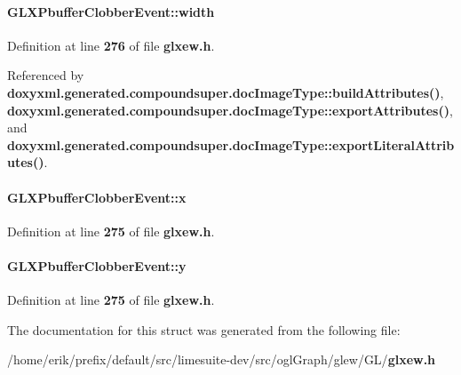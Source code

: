 \paragraph[{width}]{ G\+L\+X\+Pbuffer\+Clobber\+Event\+::width}\label{structGLXPbufferClobberEvent_aaca375fecb872c73c60cd5d0bfc7c7a5}


Definition at line {\bf 276} of file {\bf glxew.\+h}.



Referenced by {\bf doxyxml.\+generated.\+compoundsuper.\+doc\+Image\+Type\+::build\+Attributes()}, {\bf doxyxml.\+generated.\+compoundsuper.\+doc\+Image\+Type\+::export\+Attributes()}, and {\bf doxyxml.\+generated.\+compoundsuper.\+doc\+Image\+Type\+::export\+Literal\+Attributes()}.

\paragraph[{x}]{ G\+L\+X\+Pbuffer\+Clobber\+Event\+::x}\label{structGLXPbufferClobberEvent_a8f0a7162a033c89ee94ce535580dbc32}


Definition at line {\bf 275} of file {\bf glxew.\+h}.

\paragraph[{y}]{ G\+L\+X\+Pbuffer\+Clobber\+Event\+::y}\label{structGLXPbufferClobberEvent_a69eb7ac60d36ac3ec4550ac206cfc61f}


Definition at line {\bf 275} of file {\bf glxew.\+h}.



The documentation for this struct was generated from the following file\+:\begin{DoxyCompactItemize}
\item 
/home/erik/prefix/default/src/limesuite-\/dev/src/ogl\+Graph/glew/\+G\+L/{\bf glxew.\+h}\end{DoxyCompactItemize}
